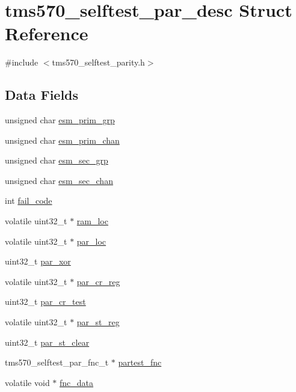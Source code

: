\hypertarget{structtms570__selftest__par__desc}{}\section{tms570\+\_\+selftest\+\_\+par\+\_\+desc Struct Reference}
\label{structtms570__selftest__par__desc}


{\ttfamily \#include $<$tms570\+\_\+selftest\+\_\+parity.\+h$>$}

\subsection*{Data Fields}
\begin{DoxyCompactItemize}
\item 
unsigned char \mbox{\hyperlink{structtms570__selftest__par__desc_a38968c33aa222c2d8f68683da796fbb7}{esm\+\_\+prim\+\_\+grp}}
\item 
unsigned char \mbox{\hyperlink{structtms570__selftest__par__desc_ac800a521c60550f15d2dd8f6a4ee679a}{esm\+\_\+prim\+\_\+chan}}
\item 
unsigned char \mbox{\hyperlink{structtms570__selftest__par__desc_ac4c35c2a4c0b10754805cb9d16bb9ee2}{esm\+\_\+sec\+\_\+grp}}
\item 
unsigned char \mbox{\hyperlink{structtms570__selftest__par__desc_a68e1575df4557ec24ac01bbf0743ae0d}{esm\+\_\+sec\+\_\+chan}}
\item 
int \mbox{\hyperlink{structtms570__selftest__par__desc_a732e7b38b092ecc88c2b75ca66a8ec45}{fail\+\_\+code}}
\item 
volatile uint32\+\_\+t $\ast$ \mbox{\hyperlink{structtms570__selftest__par__desc_a7c364d85889eb06ebad18a04d6b4bed6}{ram\+\_\+loc}}
\item 
volatile uint32\+\_\+t $\ast$ \mbox{\hyperlink{structtms570__selftest__par__desc_ad57338ea17ca720b7450e5c902281498}{par\+\_\+loc}}
\item 
uint32\+\_\+t \mbox{\hyperlink{structtms570__selftest__par__desc_a8fd1eacb2c65a2a88ee1154a2cd74518}{par\+\_\+xor}}
\item 
volatile uint32\+\_\+t $\ast$ \mbox{\hyperlink{structtms570__selftest__par__desc_a7f800142a0a663c9c9b04102ff777fd4}{par\+\_\+cr\+\_\+reg}}
\item 
uint32\+\_\+t \mbox{\hyperlink{structtms570__selftest__par__desc_aa9f536afd6a277707f7fecfcfdb63892}{par\+\_\+cr\+\_\+test}}
\item 
volatile uint32\+\_\+t $\ast$ \mbox{\hyperlink{structtms570__selftest__par__desc_ac5757ab8c22f4eee6817cd4b303c53a5}{par\+\_\+st\+\_\+reg}}
\item 
uint32\+\_\+t \mbox{\hyperlink{structtms570__selftest__par__desc_aaf4bbd7fb84a47bc319c4feb56a8c3a6}{par\+\_\+st\+\_\+clear}}
\item 
tms570\+\_\+selftest\+\_\+par\+\_\+fnc\+\_\+t $\ast$ \mbox{\hyperlink{structtms570__selftest__par__desc_ae79833e55a310290a4345fd31ef43c99}{partest\+\_\+fnc}}
\item 
volatile void $\ast$ \mbox{\hyperlink{structtms570__selftest__par__desc_abbcbb9b5e9bfd26d0c92445481ca717f}{fnc\+\_\+data}}
\end{DoxyCompactItemize}


